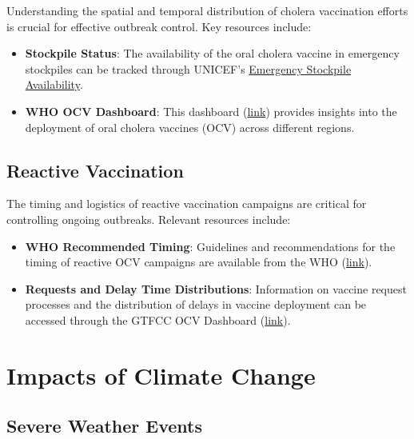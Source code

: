 \documentclass[
]{book}
\providecommand{\tightlist}{%
  \setlength{\itemsep}{0pt}\setlength{\parskip}{0pt}}
\begin{document}
Understanding the spatial and temporal distribution of cholera vaccination efforts is crucial for effective outbreak control. Key resources include:

\begin{itemize}
\tightlist
\item
  \textbf{Stockpile Status}: The availability of the oral cholera vaccine in emergency stockpiles can be tracked through UNICEF's \href{https://www.unicef.org/supply/documents/emergency-stockpile-availability-oral-cholera-vaccine}{Emergency Stockpile Availability}.
\item
  \textbf{WHO OCV Dashboard}: This dashboard (\href{https://app.powerbi.com/view?r=eyJrIjoiYmFmZTBmM2EtYWM3Mi00NWYwLTg3YjgtN2Q0MjM5ZmE1ZjFkIiwidCI6ImY2MTBjMGI3LWJkMjQtNGIzOS04MTBiLTNkYzI4MGFmYjU5MCIsImMiOjh9}{link}) provides insights into the deployment of oral cholera vaccines (OCV) across different regions.
\end{itemize}

\subsection{Reactive Vaccination}\label{reactive-vaccination}

The timing and logistics of reactive vaccination campaigns are critical for controlling ongoing outbreaks. Relevant resources include:

\begin{itemize}
\tightlist
\item
  \textbf{WHO Recommended Timing}: Guidelines and recommendations for the timing of reactive OCV campaigns are available from the WHO (\href{https://www.who.int/groups/icg/cholera/stockpiles}{link}).
\item
  \textbf{Requests and Delay Time Distributions}: Information on vaccine request processes and the distribution of delays in vaccine deployment can be accessed through the GTFCC OCV Dashboard (\href{https://apps.epicentre-msf.org/public/app/gtfcc}{link}).
\end{itemize}

\section{Impacts of Climate Change}\label{impacts-of-climate-change}

\subsection{Severe Weather Events}\label{severe-weather-events}
\end{document}
